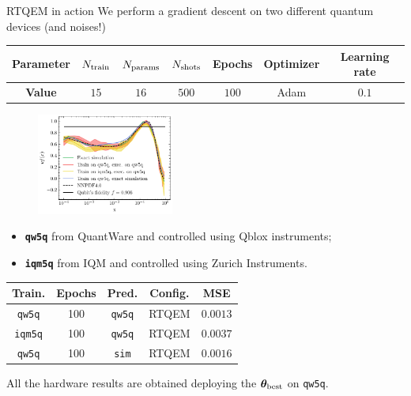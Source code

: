\documentclass[aspectratio=169, 8pt, xcolor={svgnames}, hyperref={linkcolor=black}]{beamer}
\begin{document}
\begin{frame}{RTQEM in action}
We perform a gradient descent on two different quantum devices (and noises!)
\begin{center}
\begin{tabular}{ccccccc}
\hline \hline 
\rule{0pt}{2.5ex}
\textbf{Parameter} & $N_{\rm train}$ & $N_{\rm params}$ & $N_{\rm shots}$ & Epochs & Optimizer & Learning rate \\
\hline
\rule{0pt}{2.5ex}
\textbf{Value} & $15$ & $16$ & $500$ & $100$ & Adam & $0.1$ \\
\hline \hline 
\end{tabular}
\end{center}
\begin{multicols}{2}

\begin{figure}
    \includegraphics[width=0.4\textwidth]{figures/100.pdf}%
\end{figure}
\begin{center}
\begin{itemize}[noitemsep]
  \item[\faCog] \textbf{\texttt{qw5q}} from QuantWare and controlled using Qblox instruments;
  \item[\faCog] \textbf{\texttt{iqm5q}} from IQM and controlled using Zurich Instruments.
\end{itemize}
\footnotesize
\begin{table}
\begin{tabular}{ccccc}
\hline \hline 
\textbf{Train.} & \textbf{Epochs} & \textbf{Pred.} &  \textbf{Config.} & MSE \\
\hline    
\texttt{qw5q} & 100 & \texttt{qw5q} & RTQEM & $0.0013$  \\     
\texttt{iqm5q} & 100 & \texttt{qw5q} & RTQEM & $0.0037$ \\   
\texttt{qw5q} & 100& \texttt{sim} & RTQEM & $0.0016$ \\   
\hline \hline
\end{tabular}
\centering
\end{table}
\end{center}
\end{multicols}
All the hardware results are obtained deploying the $\bm{\theta}_{\rm best}$ on 
\texttt{qw5q}.
\end{frame}
\end{document}
